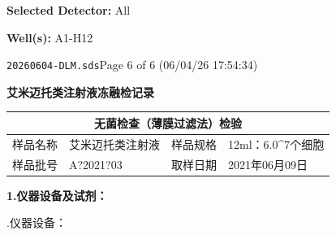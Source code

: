 \documentclass[UTF8,10pt,a4paper,fontset=fandol]{ctexart}
\newcommand{\fieldvalue}[1]{#1}
\newcommand{\handwritten}[1]{#1}
\begin{document}
\noindent
\textbf{Selected Detector:}
\fieldvalue{All}

\noindent
\textbf{Well(s):}
\fieldvalue{A1-H12}

\vfill

\noindent\texttt{20260604-DLM.sds}\hfill Page 6 of 6 (06/04/26 17:54:34)

\newpage

\begin{center}
\textbf{艾米迈托类注射液冻融检记录}
\end{center}

\begin{tabular}{|p{2.2cm}|p{5.2cm}|p{2.2cm}|p{4.2cm}|}
\hline
\multicolumn{4}{|c|}{无菌检查（薄膜过滤法）检验}\\
\hline
样品名称 &
\fieldvalue{艾米迈托类注射液} &
样品规格 &
\fieldvalue{12ml：6.0\times10^{7}个细胞}\\
\hline
样品批号 &
\fieldvalue{\handwritten{A?2021?03}} &
取样日期 &
\fieldvalue{\handwritten{2021年06月09日}}\\
\hline
\end{tabular}

\medskip

\noindent\textbf{1.\quad 仪器设备及试剂：}

.\quad 仪器设备：
\end{document}
